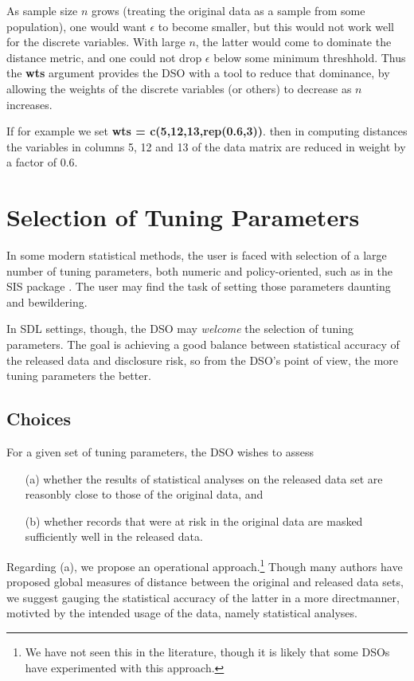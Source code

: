 \documentclass[11pt]{article}
\begin{document}
As sample size $n$ grows (treating the original data as a sample from
some population), one would want $\epsilon$ to become smaller, but this
would not work well for the discrete variables.  With large $n$, the
latter would come to dominate the distance metric, and one could not
drop $\epsilon$ below some minimum threshhold.  Thus the {\bf wts}
argument provides the DSO with a tool to reduce that dominance, by
allowing the weights of the discrete variables (or others) to decrease
as $n$ increases.

If for example we set {\bf wts = c(5,12,13,rep(0.6,3))}. then in
computing distances the variables in columns 5, 12 and 13 of the data
matrix are reduced in weight by a factor of 0.6.  

\section{Selection of Tuning Parameters}

In some modern statistical methods, the user is faced with selection of
a large number of tuning parameters, both numeric and policy-oriented,
such as in the SIS package \cite{fan}.  The user may find the task of
setting those parameters daunting and bewildering.

In SDL settings, though, the DSO may {\it welcome} the selection of
tuning parameters. The goal is achieving a good balance between
statistical accuracy of the released data and disclosure risk, so from
the DSO's point of view, the more tuning parameters the better.

\subsection{Choices}

For a given set of tuning parameters, the DSO wishes to assess

\begin{itemize}

\item [(a)] whether the results of statistical  analyses on the released
data set are reasonbly close to those of the original data, and 

\item [(b)]
whether records that were at risk in the original data are masked 
sufficiently well in the released data.

\end{itemize}

Regarding (a), we propose an operational approach.\footnote{We have not
seen this in the literature, though it is likely that some DSOs have
experimented with this approach.}  Though many authors have proposed
global measures of distance between the original and released data sets,
we suggest gauging the statistical accuracy of the latter in a more
directmanner, motivted by the intended usage of the data, namely
statistical analyses.
\end{document}
